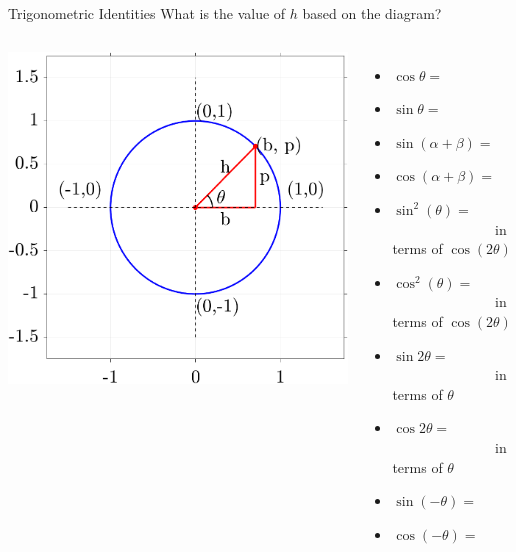 \documentclass[aspectratio=169,xcolor=dvipsnames,svgnames,x11names,fleqn]{beamer}
\begin{document}
\begin{frame}{Trigonometric Identities}
What is the value of $h$ based on the diagram?
    \begin{columns}
    \includegraphics[width=0.99\linewidth, trim=2cm 2cm 1cm 1cm,clip]{figures/unit_circle_right_triangle.png}
        \begin{itemize}
            \item $\cos\theta =  $
            \item $\sin\theta = $
            \item $\sin(\alpha + \beta) = $
            \item $\cos(\alpha + \beta) = $
            \item $\sin^2(\theta) = $ $\quad\quad\quad\quad\quad\quad\quad$ in terms of $\cos(2\theta)$
            \item $\cos^2(\theta) = $ $\quad\quad\quad\quad\quad\quad\quad$ in terms of $\cos(2\theta)$
            \item $\sin 2\theta = $ $\quad\quad\quad\quad\quad\quad\quad$ in terms of $\theta$
            \item $\cos 2\theta = $ $\quad\quad\quad\quad\quad\quad\quad$ in terms of $\theta$
            \item $\sin (-\theta) = $
            \item $\cos(-\theta) = $
                
            
        \end{itemize}
    \end{columns}
\end{frame}
\end{document}
